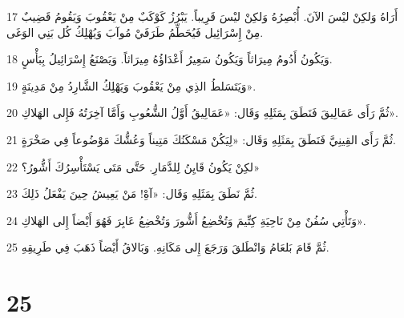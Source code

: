 \par 17 أَرَاهُ وَلكِنْ ليْسَ الآنَ. أُبْصِرُهُ وَلكِنْ ليْسَ قَرِيباً. يَبْرُزُ كَوْكَبٌ مِنْ يَعْقُوبَ وَيَقُومُ قَضِيبٌ مِنْ إِسْرَائِيل فَيُحَطِّمُ طَرَفَيْ مُوآبَ وَيُهْلِكُ كُل بَنِي الوَغَى.
\par 18 وَيَكُونُ أَدُومُ مِيرَاثاً وَيَكُونُ سَعِيرُ أَعْدَاؤُهُ مِيرَاثاً. وَيَصْنَعُ إِسْرَائِيلُ بِبَأْسٍ.
\par 19 وَيَتَسَلطُ الذِي مِنْ يَعْقُوبَ وَيَهْلِكُ الشَّارِدُ مِنْ مَدِينَةٍ».
\par 20 ثُمَّ رَأَى عَمَالِيقَ فَنَطَقَ بِمَثَلِهِ وَقَال: «عَمَالِيقُ أَوَّلُ الشُّعُوبِ وَأَمَّا آخِرَتُهُ فَإِلى الهَلاكِ».
\par 21 ثُمَّ رَأَى القِينِيَّ فَنَطَقَ بِمَثَلِهِ وَقَال: «لِيَكُنْ مَسْكَنُكَ مَتِيناً وَعُشُّكَ مَوْضُوعاً فِي صَخْرَةٍ.
\par 22 لكِنْ يَكُونُ قَايِنُ لِلدَّمَارِ. حَتَّى مَتَى يَسْتَأْسِرُكَ أَشُّورُ؟»
\par 23 ثُمَّ نَطَقَ بِمَثَلِهِ وَقَال: «آهِْ! مَنْ يَعِيشُ حِينَ يَفْعَلُ ذَلِكَ.
\par 24 وَتَأْتِي سُفُنٌ مِنْ نَاحِيَةِ كِتِّيمَ وَتُخْضِعُ أَشُّورَ وَتُخْضِعُ عَابِرَ فَهُوَ أَيْضاً إِلى الهَلاكِ».
\par 25 ثُمَّ قَامَ بَلعَامُ وَانْطَلقَ وَرَجَعَ إِلى مَكَانِهِ. وَبَالاقُ أَيْضاً ذَهَبَ فِي طَرِيقِهِ.

\chapter{25}


